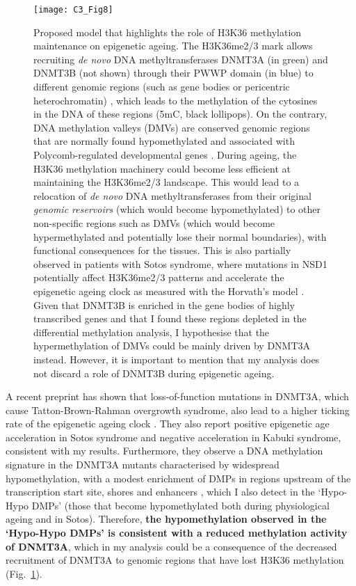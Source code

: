 \begin{figure}[htbp!] 
	\centering    
	\texttt{[image: C3\_Fig8]}
	\vspace*{1 mm}
	\caption[Proposed model that highlights the role of H3K36 methylation maintenance on epigenetic ageing]{Proposed model that highlights the role of H3K36 methylation maintenance on epigenetic ageing. The H3K36me2/3 mark allows recruiting \textit{de novo} DNA methyltransferases DNMT3A (in green) and DNMT3B (not shown) through their PWWP domain (in blue) to different genomic regions (such as gene bodies or pericentric heterochromatin) \citep{Baubec2015,Chantalat2011,Chen2004}, which leads to the methylation of the cytosines in the DNA of these regions (\acrshort{5mC}, black lollipops). On the contrary, DNA methylation valleys (\acrshort{DMV}s) are conserved genomic regions that are normally found hypomethylated and associated with Polycomb-regulated developmental genes \citep{Xie2013,Long2013,Jeong2013,Li2018}. During ageing, the H3K36 methylation machinery could become less efficient at maintaining the H3K36me2/3 landscape. This would lead to a relocation of \textit{de novo} DNA methyltransferases from their original \textit{genomic reservoirs} (which would become hypomethylated) to other non-specific regions such as DMVs (which would become hypermethylated and potentially lose their normal boundaries), with functional consequences for the tissues. This is also partially observed in patients with Sotos syndrome, where mutations in NSD1 potentially affect H3K36me2/3 patterns and accelerate the epigenetic ageing clock as measured with the Horvath's model \citep{Horvath2013}. Given that DNMT3B is enriched in the gene bodies of highly transcribed genes \citep{Baubec2015} and that I found these regions depleted in the differential methylation analysis, I hypothesise that the hypermethylation of DMVs could be mainly driven by DNMT3A instead. However, it is important to mention that my analysis does not discard a role of DNMT3B during epigenetic ageing.}
	\label{fig:c3_fig8}
\end{figure}

\bigskip

A recent preprint has shown that loss-of-function mutations in DNMT3A, which cause Tatton-Brown-Rahman overgrowth syndrome, also lead to a higher ticking rate of the epigenetic ageing clock \citep{Jeffries2018}. They also report positive epigenetic age acceleration in Sotos syndrome and negative acceleration in Kabuki syndrome, consistent with my results. Furthermore, they observe a DNA methylation signature in the DNMT3A mutants characterised by widespread hypomethylation, with a modest enrichment of DMPs in regions upstream of the transcription start site, shores and enhancers \citep{Jeffries2018}, which I also detect in the `Hypo-Hypo DMPs' (those that become hypomethylated both during physiological ageing and in Sotos). Therefore, \textbf{the hypomethylation observed in the `Hypo-Hypo DMPs' is consistent with a reduced methylation activity of DNMT3A}, which in my analysis could be a consequence of the decreased recruitment of DNMT3A to genomic regions that have lost H3K36 methylation (Fig.~\ref{fig:c3_fig8}).

